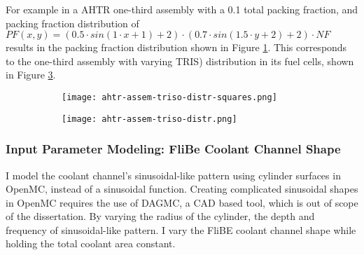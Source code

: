 For example in a \gls{AHTR} one-third assembly with a 0.1 total packing fraction, and packing 
fraction distribution of $PF(x, y) = \left(0.5\cdot sin(1\cdot x + 1) + 2\right) \cdot 
\left(0.7\cdot sin(1.5\cdot y + 2) + 2\right) \cdot NF$ results in the packing fraction 
distribution shown in Figure \ref{fig:ahtr-assem-triso-distr-squares}.
This corresponds to the one-third assembly with varying TRIS) distribution in its fuel 
cells, shown in Figure \ref{fig:ahtr-assem-triso-distr}. 
\begin{figure}[]
    \centering
    \begin{subfigure}{0.49\textwidth}
        \texttt{[image: ahtr-assem-triso-distr-squares.png]}
        \caption{}
        \label{fig:ahtr-assem-triso-distr-squares} 
    \end{subfigure}
    \begin{subfigure}{0.49\textwidth}
        \texttt{[image: ahtr-assem-triso-distr.png]}
        \raggedleft
        \caption{}
        \label{fig:ahtr-assem-triso-distr} 
    \end{subfigure}
    \caption{}
\end{figure}

\subsubsection{Input Parameter Modeling: FliBe Coolant Channel Shape}
I model the coolant channel's sinusoidal-like pattern using cylinder surfaces in OpenMC, 
instead of a sinusoidal function. 
Creating complicated sinusoidal shapes in OpenMC requires the use of DAGMC, a CAD based tool, 
which is out of scope of the dissertation.
By varying the radius of the cylinder, the depth and frequency of sinusoidal-like 
pattern.
I vary the FliBE coolant channel shape while holding the total coolant area constant. 


